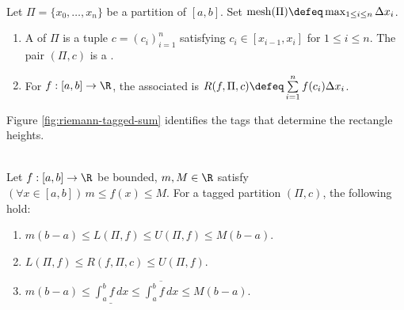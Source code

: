 \begin{definition} \label{def:tagged-partitions-and-riemann-sums} \\
Let $\Pi=\{x_0,\ldots,x_n\}$ be a partition of $[a,b]$. Set $\operatorname{mesh}(\Pi)\defeq\max_{1\leq i\leq n}\Delta x_i$.
\begin{enumerate}[label=(\roman*)]
\setlength{\itemsep}{0pt}
\item A  of $\Pi$ is a tuple $c=(c_i)_{i=1}^{n}$ satisfying $c_i\in[x_{i-1},x_i]$ for $1\leq i\leq n$. The pair $(\Pi,c)$ is a .
\item For $f:[a,b]\to\R$, the associated  is $R(f,\Pi,c)\defeq\sum\limits_{i=1}^{n}f(c_i)\Delta x_i$.
\end{enumerate}
\end{definition}

\noindent Figure \ref{fig:riemann-tagged-sum} identifies the tags that determine the rectangle heights.

\begin{illustrationfigure}[H]
  \centering
  
  \caption{A tagged Riemann sum uses the sampled height $f(c_i)$ on each subinterval $[x_{i-1},x_i]$.}
  \label{fig:riemann-tagged-sum}
\end{illustrationfigure}

\begin{proposition} \label{prop:riemann-darboux-and-tagged-sum-bounds} \\
Let $f:[a,b]\to\R$ be bounded, $m,M\in\R$ satisfy $(\forall x\in[a,b])\,m\leq f(x)\leq M$. For a tagged partition $(\Pi,c)$, the following hold:
\begin{enumerate}[label=(\roman*)]
\setlength{\itemsep}{0pt}
\item $m(b-a)\leq L(\Pi,f)\leq U(\Pi,f)\leq M(b-a)$.
\item $L(\Pi,f)\leq R(f,\Pi,c)\leq U(\Pi,f)$.
\item $m(b-a)\leq\underline{\int_a^b f\,dx}\leq\overline{\int_a^b f\,dx}\leq M(b-a)$.
\end{enumerate}
\end{proposition}


